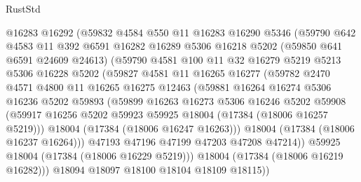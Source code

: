 \begin{lexlean}{RustStd}
\begin{coremodule}
              @16283
              @16292
              (@59832
                @4584
                @550
                @11
                @16283
                @16290
                @5346
                (@59790
                  @642
                  @4583
                  @11
                  @392
                  @6591
                  @16282
                  @16289
                  @5306
                  @16218
                  @5202
                  (@59850 @641 @6591 @24609 @24613)
                  (@59790
                    @4581
                    @100
                    @11
                    @32
                    @16279
                    @5219
                    @5213
                    @5306
                    @16228
                    @5202
                    (@59827
                      @4581
                      @11
                      @16265
                      @16277
                      (@59782
                        @2470
                        @4571
                        @4800
                        @11
                        @16265
                        @16275
                        @12463
                        (@59881
                          @16264
                          @16274
                          @5306
                          @16236
                          @5202
                          @59893
                          (@59899
                            @16263
                            @16273
                            @5306
                            @16246
                            @5202
                            @59908
                            (@59917
                              @16256
                              @5202
                              @59923
                              @59925
                              @18004
                              (@17384 (@18006 @16257 @5219)))
                            @18004
                            (@17384 (@18006 @16247 @16263)))
                          @18004
                          (@17384 (@18006 @16237 @16264)))
                        @47193
                        @47196
                        @47199
                        @47203
                        @47208
                        @47214))
                    @59925
                    @18004
                    (@17384 (@18006 @16229 @5219)))
                  @18004
                  (@17384 (@18006 @16219 @16282)))
                @18094
                @18097
                @18100
                @18104
                @18109
                @18115))

\end{coremodule}
\end{lexlean}
